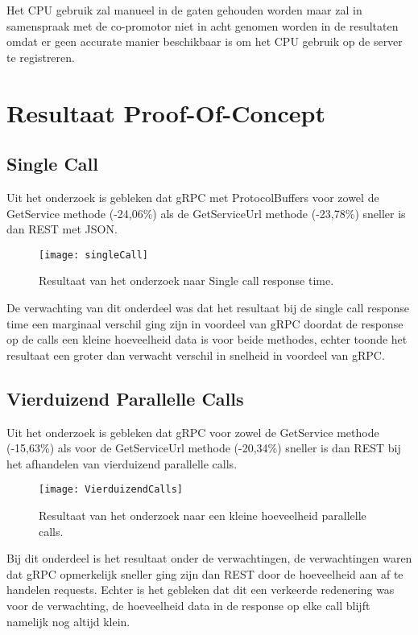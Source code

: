 Het CPU gebruik zal manueel in de gaten gehouden worden maar zal in samenspraak met de co-promotor niet in acht genomen worden in de resultaten omdat er geen accurate manier beschikbaar is om het CPU gebruik op de server te registreren.

\section{Resultaat Proof-Of-Concept}
\label{sec:Resultaat Proof-Of-Concept}

\subsection{Single Call}
\label{subsec:Single Call}
Uit het onderzoek is gebleken dat gRPC met ProtocolBuffers voor zowel de GetService methode (-24,06\%) als de GetServiceUrl methode (-23,78\%) sneller is dan REST met JSON.
\begin{figure}[H]
    \centering
    \texttt{[image: singleCall]}
    \caption[Single Call Response Time]{Resultaat van het onderzoek naar Single call response time.}
    \label{fig:SingleCallResult}
\end{figure}

De verwachting van dit onderdeel was dat het resultaat bij de single call response time een marginaal verschil ging zijn in voordeel van gRPC doordat de response op de calls een kleine hoeveelheid data is voor beide methodes, echter toonde het resultaat een groter dan verwacht verschil in snelheid in voordeel  van gRPC.

\subsection{Vierduizend Parallelle Calls}
\label{subsec:Vierduizend parallelle calls}
Uit het onderzoek is gebleken dat gRPC voor zowel de GetService methode (-15,63\%) als voor de GetServiceUrl methode (-20,34\%) sneller is dan REST bij het afhandelen van vierduizend parallelle calls.
\begin{figure}[H]
    \centering
    \texttt{[image: VierduizendCalls]}
    \caption[Resultaten van vierduizend parallelle calls]{Resultaat van het onderzoek naar een kleine hoeveelheid parallelle calls.}
    \label{fig:VierduizendCallsResult}
\end{figure}

Bij dit onderdeel is het resultaat onder de verwachtingen, de verwachtingen waren dat gRPC opmerkelijk sneller ging zijn dan REST door de hoeveelheid aan af te handelen requests. Echter is het gebleken dat dit een verkeerde redenering was voor de verwachting, de hoeveelheid data in de response op elke call blijft namelijk nog altijd klein.

